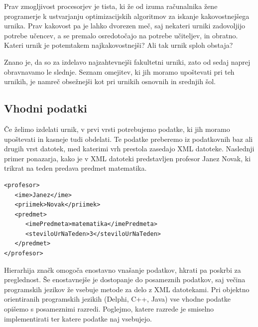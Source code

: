 \documentclass[a4paper,10pt]{article}
\begin{document}
Prav zmogljivost procesorjev je tista, ki že od izuma računalnika žene programerje k
ustvarjanju optimizacijskih algoritmov za iskanje kakovostnejšega urnika. Prav kakovost
pa je lahko dvorezen meč, saj nekateri urniki zadovoljijo potrebe učencev, a se premalo
osredotočajo na potrebe učiteljev, in obratno. Kateri urnik je potemtakem najkakovostnejši?
Ali tak urnik sploh obstaja?

Znano je, da so za izdelavo najzahtevnejši fakultetni urniki, zato od sedaj naprej
obravnavamo le slednje. Seznam omejitev, ki jih moramo upoštevati pri teh urnikih,
je namreč obsežnejši kot pri urnikih osnovnih in srednjih šol.

\subsection{Vhodni podatki} %

Če želimo izdelati urnik, v prvi vrsti potrebujemo podatke, ki jih moramo upoštevati in
kasneje tudi obdelati. Te podatke preberemo iz podatkovnih baz ali drugih vrst datotek,
med katerimi vrh prestola zasedajo XML datoteke. Naslednji primer ponazarja, kako je v
XML datoteki predstavljen profesor Janez Novak, ki trikrat na teden predava predmet
matematika.


\begin{verbatim}
<profesor>
   <ime>Janez</ime>
   <priimek>Novak</priimek>
   <predmet>
      <imePredmeta>matematika</imePredmeta>
      <steviloUrNaTeden>3</steviloUrNaTeden>
   </predmet>
</profesor>
\end{verbatim}

Hierarhija značk omogoča enostavno vnašanje podatkov, hkrati pa poskrbi za preglednost.
Še enostavnejše je dostopanje do posameznih podatkov, saj večina programskih jezikov že
vsebuje metode za delo z XML datotekami.
\noindent
Pri objektno orientiranih programskih jezikih (Delphi, C++, Java) vse vhodne podatke
opišemo s posameznimi razredi. Poglejmo, katere razrede je smiselno implementirati ter
katere podatke naj vsebujejo.
\end{document}
